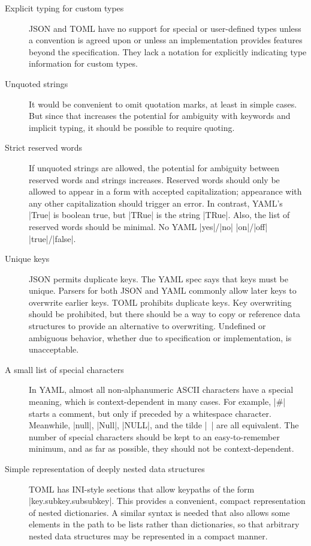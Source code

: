 \documentclass[11pt]{article}
\begin{document}
\begin{description}
\item[Explicit typing for custom types]  JSON and TOML have no support for special or user-defined types unless a convention is agreed upon or unless an implementation provides features beyond the specification.  They lack a notation for explicitly indicating type information for custom types.

\item[Unquoted strings]  It would be convenient to omit quotation marks, at least in simple cases.  But since that increases the potential for ambiguity with keywords and implicit typing, it should be possible to require quoting.

\item[Strict reserved words]  If unquoted strings are allowed, the potential for ambiguity between reserved words and strings increases.  Reserved words should only be allowed to appear in a form with accepted capitalization; appearance with any other capitalization should trigger an error.  In contrast, YAML's |True| is boolean true, but |TRue| is the string |TRue|.  Also, the list of reserved words should be minimal.  No YAML |yes|/|no| |on|/|off| |true|/|false|.

\item[Unique keys] JSON permits duplicate keys.  The YAML spec says that keys must be unique.  Parsers for both JSON and YAML commonly allow later keys to overwrite earlier keys.  TOML prohibits duplicate keys.  Key overwriting should be prohibited, but there should be a way to copy or reference data structures to provide an alternative to overwriting.  Undefined or ambiguous behavior, whether due to specification or implementation, is unacceptable.

\item[A small list of special characters] In YAML, almost all non-alphanumeric ASCII characters have a special meaning, which is context-dependent in many cases.  For example, |#| starts a comment, but only if preceded by a whitespace character.  Meanwhile, |null|, |Null|, |NULL|, and the tilde |~| are all equivalent.  The number of special characters should be kept to an easy-to-remember minimum, and as far as possible, they should not be context-dependent.  

\item[Simple representation of deeply nested data structures]  TOML has INI-style sections that allow keypaths of the form |key.subkey.subsubkey|.  This provides a convenient, compact representation of nested dictionaries.  A similar syntax is needed that also allows some elements in the path to be lists rather than dictionaries, so that arbitrary nested data structures may be represented in a compact manner.


\end{description}
\end{document}
